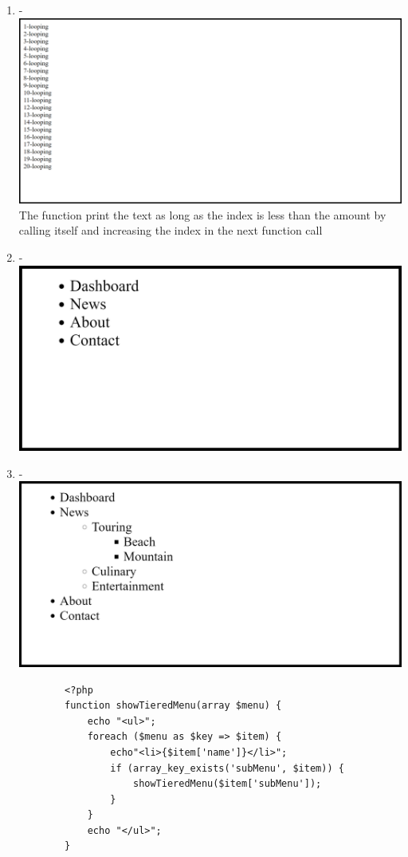 \documentclass[12pt,titlepage]{article}
\begin{document}
\begin{enumerate}
    \item - \\ \includegraphics[width=.9\textwidth]{images/figures/fig10.png} \\ The function print the text as long as the index is less than the amount by calling itself and increasing the index in the next function call
    \item - \\ \includegraphics[width=.9\textwidth]{images/figures/fig11.png}
    
    \newpage

    \item - \\ \includegraphics[width=.9\textwidth]{images/figures/fig12.png}
    \begin{verbatim}
        <?php
        function showTieredMenu(array $menu) {
            echo "<ul>";
            foreach ($menu as $key => $item) {
                echo"<li>{$item['name']}</li>";
                if (array_key_exists('subMenu', $item)) {
                    showTieredMenu($item['subMenu']);
                }
            }
            echo "</ul>";
        }
        

\end{verbatim}
\end{enumerate}
\end{document}

